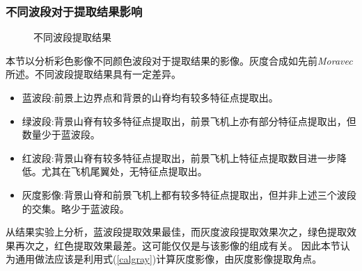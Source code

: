     \subsubsection{不同波段对于提取结果影响}
    \begin{figure}[H]
        \centering
        \caption{不同波段提取结果}
        \label{harrisf16rgbg}
    \end{figure}

    本节以分析彩色影像不同颜色波段对于提取结果的影像。灰度合成如先前\textit{Moravec}所述。不同波段提取结果具有一定差异。
    \begin{itemize}
        \item 蓝波段:前景上边界点和背景的山脊均有较多特征点提取出。
        \item 绿波段:背景山脊有较多特征点提取出，前景飞机上亦有部分特征点提取出，但数量少于蓝波段。
        \item 红波段:背景山脊有较多特征点提取出，前景飞机上特征点提取数目进一步降低。尤其在飞机尾翼处，无特征点提取出。
        \item 灰度影像:背景山脊和前景飞机上都有较多特征点提取出，但并非上述三个波段的交集。略少于蓝波段。
    \end{itemize}
    从结果实验上分析，蓝波段提取效果最佳，而灰度波段提取效果次之，绿色提取效果再次之，红色提取效果最差。这可能仅仅是与该影像的组成有关。
    因此本节认为通用做法应该是利用式(\ref{calgray})计算灰度影像，由灰度影像提取角点。

